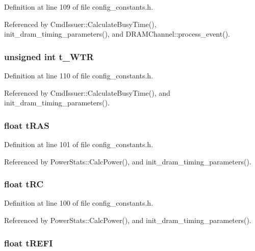 Definition at line 109 of file config\_\-constants.h.

Referenced by CmdIssuer::CalculateBusyTime(), init\_\-dram\_\-timing\_\-parameters(), and DRAMChannel::process\_\-event().
\subsubsection[{t\_\-WTR}]{\setlength{\rightskip}{0pt plus 5cm}unsigned int {\bf t\_\-WTR}}\label{mc__constants_8h_d36ceba3d5676b7702892a0527881687}




Definition at line 110 of file config\_\-constants.h.

Referenced by CmdIssuer::CalculateBusyTime(), and init\_\-dram\_\-timing\_\-parameters().
\subsubsection[{tRAS}]{\setlength{\rightskip}{0pt plus 5cm}float {\bf tRAS}}\label{mc__constants_8h_aff3cd5f072642f33b34e22dc51e9210}




Definition at line 101 of file config\_\-constants.h.

Referenced by PowerStats::CalcPower(), and init\_\-dram\_\-timing\_\-parameters().
\subsubsection[{tRC}]{\setlength{\rightskip}{0pt plus 5cm}float {\bf tRC}}\label{mc__constants_8h_484732b54a34fb6027a9165e56755a7c}




Definition at line 100 of file config\_\-constants.h.

Referenced by PowerStats::CalcPower(), and init\_\-dram\_\-timing\_\-parameters().
\subsubsection[{tREFI}]{\setlength{\rightskip}{0pt plus 5cm}float {\bf tREFI}}\label{mc__constants_8h_abdac28cd7c2fdbdaf6dfba8f07c26d6}




